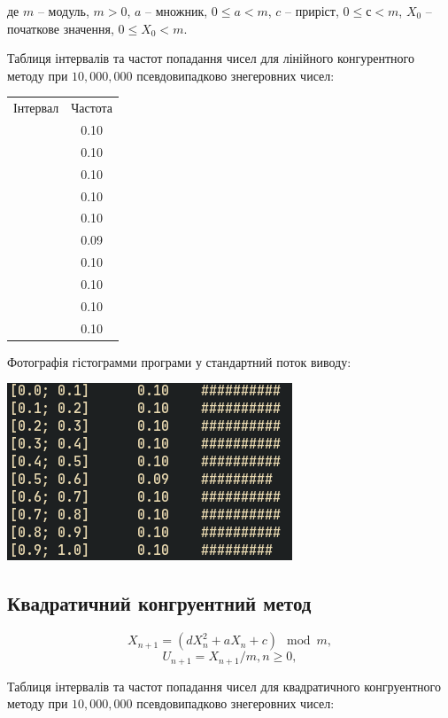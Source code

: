 \documentclass[a4paper,12pt]{report}
\begin{document}
де $m$ – модуль, $m > 0$, $a$ – множник, $0 \le a < m$, $c$ – приріст, $0 \le с < m$, $X_{0}$ – початкове
значення, $0 \le X_{0} < m$.

Таблиця інтервалів та частот попадання чисел для лінійного конгурентного методу при $10,000,000$ псевдовипадково знегеровних чисел:

\begin{table}[ht]
\centering %
\begin{tabular}{c c} %
  Інтервал & Частота \\\relax
  [0.0; 0.1] & 0.10 \\\relax
  [0.1; 0.2] & 0.10 \\\relax
  [0.2; 0.3] & 0.10 \\\relax
  [0.3; 0.4] & 0.10 \\\relax
  [0.4; 0.5] & 0.10 \\\relax
  [0.5; 0.6] & 0.09 \\\relax
  [0.6; 0.7] & 0.10 \\\relax
  [0.7; 0.8] & 0.10 \\\relax
  [0.8; 0.9] & 0.10 \\\relax
  [0.9; 1.0] & 0.10
\end{tabular}
\end{table}
Фотографія гістограмми програми у стандартний поток виводу:
\begin{center}\includegraphics[scale=0.5]{linear}\end{center}

\subsection{Квадратичний конгруентний метод}
\[X_{n+1}=(dX_{n}^{2}  + aX_{n} + c )\mod m,\]
\[U_{n+1} = X_{n+1}/m, n\ge0, \]

Таблиця інтервалів та частот попадання чисел для квадратичного конгруентного методу при $10,000,000$ псевдовипадково знегеровних чисел:
\end{document}

